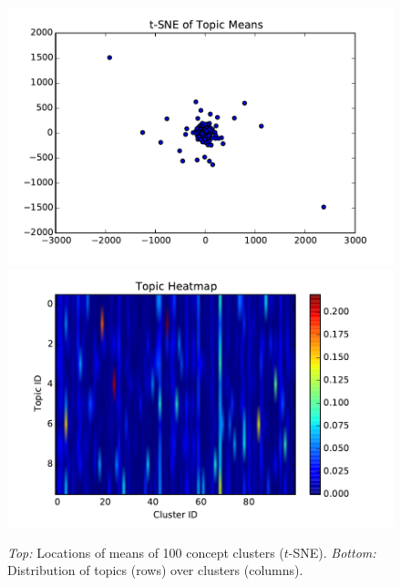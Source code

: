\documentclass[11pt]{article}
\begin{document}
\begin{figure}
\centering
\includegraphics[width=\columnwidth]{assets/gtm100_mu_tsne.pdf}
\includegraphics[width=\columnwidth]{assets/gtm100_topic_heatmap.pdf}
\caption{\label{fig:gtm-globals} \emph{Top:} Locations of means of 100 concept clusters ($t$-SNE). \emph{Bottom:} Distribution of topics (rows) over clusters (columns).}
\end{figure}
\end{document}
